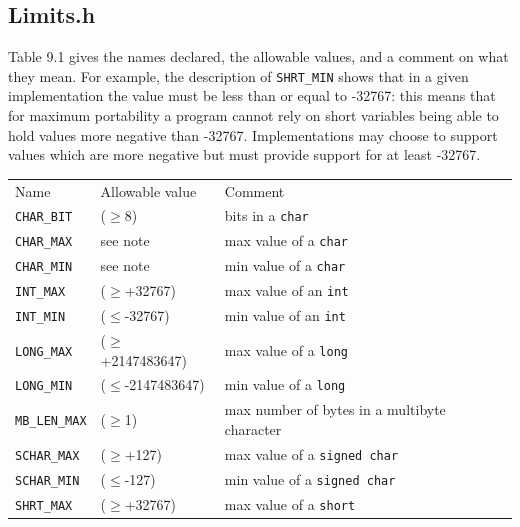   \subsection{Limits.h}
   

   Table 9.1 gives the names declared, the allowable values,
    and a comment on what they mean.  For example, the
    description of \texttt{SHRT\_MIN} shows that in a given implementation
    the value must be less than or equal to -32767: this means
    that for maximum portability a program cannot rely on short
    variables being able to hold values more negative than
    -32767.  Implementations may choose to support values which
    are more negative but must provide support for at least
    -32767.


   \begin{tabular}{llp{\textwidth}}
     Name & Allowable value & Comment
    \\

     \texttt{CHAR\_BIT} & ($\geq$8) & bits in a \texttt{char}
    \\

     \texttt{CHAR\_MAX} & see note & max value of a \texttt{char}
    \\

     \texttt{CHAR\_MIN} & see note & min value of a \texttt{char}
    \\

     \texttt{INT\_MAX} & ($\geq$+32767) & max value of an \texttt{int}
    \\

     \texttt{INT\_MIN} & ($\leq$-32767) & min value of an \texttt{int}
    \\

     \texttt{LONG\_MAX} & ($\geq$+2147483647) & max value of a \texttt{long}
    \\

     \texttt{LONG\_MIN} & ($\leq$-2147483647) & min value of a \texttt{long}
    \\

     \texttt{MB\_LEN\_MAX} & ($\geq$1) & max number of bytes in a multibyte character
    \\

     \texttt{SCHAR\_MAX} & ($\geq$+127) & max value of a \texttt{signed char}
    \\

     \texttt{SCHAR\_MIN} & ($\leq$-127) & min value of a \texttt{signed char}
    \\

     \texttt{SHRT\_MAX} & ($\geq$+32767) & max value of a \texttt{short}
    \\


\end{tabular}
